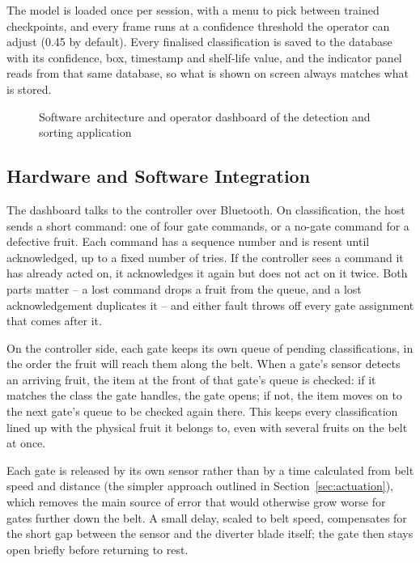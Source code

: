 The model is loaded once per session, with a menu to pick between trained checkpoints, and every frame runs at a confidence threshold the operator can adjust (0.45 by default). Every finalised classification is saved to the database with its confidence, box, timestamp and shelf-life value, and the indicator panel reads from that same database, so what is shown on screen always matches what is stored.

\begin{figure}[H]
\centering
{}
\caption{Software architecture and operator dashboard of the detection and sorting application}
\label{fig:software}
\end{figure}

\subsection{Hardware and Software Integration}
\label{sec:m_integration}

The dashboard talks to the controller over Bluetooth. On classification, the host sends a short command: one of four gate commands, or a no-gate command for a defective fruit. Each command has a sequence number and is resent until acknowledged, up to a fixed number of tries. If the controller sees a command it has already acted on, it acknowledges it again but does not act on it twice. Both parts matter -- a lost command drops a fruit from the queue, and a lost acknowledgement duplicates it -- and either fault throws off every gate assignment that comes after it.

On the controller side, each gate keeps its own queue of pending classifications, in the order the fruit will reach them along the belt. When a gate's sensor detects an arriving fruit, the item at the front of that gate's queue is checked: if it matches the class the gate handles, the gate opens; if not, the item moves on to the next gate's queue to be checked again there. This keeps every classification lined up with the physical fruit it belongs to, even with several fruits on the belt at once.

Each gate is released by its own sensor rather than by a time calculated from belt speed and distance (the simpler approach outlined in Section~\ref{sec:actuation}), which removes the main source of error that would otherwise grow worse for gates further down the belt. A small delay, scaled to belt speed, compensates for the short gap between the sensor and the diverter blade itself; the gate then stays open briefly before returning to rest.

